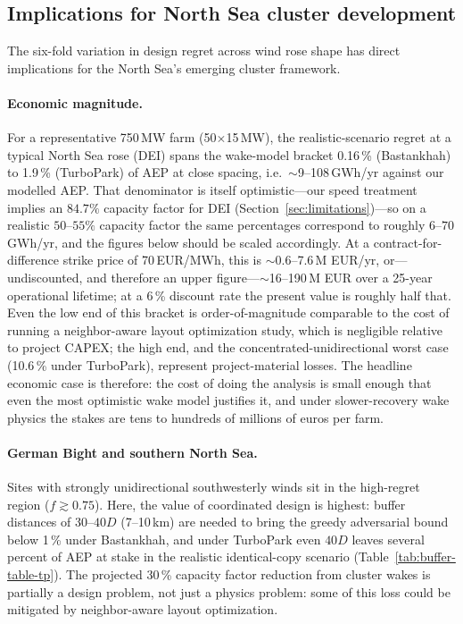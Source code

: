 \documentclass[wes, manuscript]{copernicus}
\begin{document}
\subsection{Implications for North Sea cluster development}

The six-fold variation in design regret across wind rose shape has direct implications for the North Sea's emerging cluster framework.

\paragraph{Economic magnitude.}
For a representative 750\,MW farm (50$\times$15\,MW), the realistic-scenario regret at a typical North Sea rose (DEI) spans the wake-model bracket 0.16\,\% (Bastankhah) to 1.9\,\% (TurboPark) of AEP at close spacing, i.e.\ $\sim$9--108\,GWh/yr against our modelled AEP.
That denominator is itself optimistic---our speed treatment implies an $84.7\%$ capacity factor for DEI (Section~\ref{sec:limitations})---so on a realistic $50$--$55\%$ capacity factor the same percentages correspond to roughly $6$--$70$\,GWh/yr, and the figures below should be scaled accordingly.
At a contract-for-difference strike price of 70\,EUR/MWh, this is $\sim$0.6--7.6\,M EUR/yr, or---undiscounted, and therefore an upper figure---$\sim$16--190\,M EUR over a 25-year operational lifetime; at a 6\,\% discount rate the present value is roughly half that.
Even the low end of this bracket is order-of-magnitude comparable to the cost of running a neighbor-aware layout optimization study, which is negligible relative to project CAPEX; the high end, and the concentrated-unidirectional worst case (10.6\,\% under TurboPark), represent project-material losses.
The headline economic case is therefore: the cost of doing the analysis is small enough that even the most optimistic wake model justifies it, and under slower-recovery wake physics the stakes are tens to hundreds of millions of euros per farm.

\paragraph{German Bight and southern North Sea.}
Sites with strongly unidirectional southwesterly winds sit in the high-regret region ($f \gtrsim 0.75$).
Here, the value of coordinated design is highest: buffer distances of $30$--$40D$ (7--10\,km) are needed to bring the greedy adversarial bound below 1\,\% under Bastankhah, and under TurboPark even $40D$ leaves several percent of AEP at stake in the realistic identical-copy scenario (Table~\ref{tab:buffer-table-tp}).
The projected 30\,\% capacity factor reduction from cluster wakes \citep{Fliegner2025} is partially a design problem, not just a physics problem: some of this loss could be mitigated by neighbor-aware layout optimization.
\end{document}
